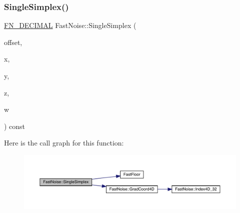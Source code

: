 \subsubsection{\texorpdfstring{Single\+Simplex()}{SingleSimplex()}\hspace{0.1cm}{\footnotesize\ttfamily [3/3]}}
{\footnotesize\ttfamily \mbox{\hyperlink{_fast_noise_8h_a75a9ef6d2541c4921815b885bfd449c3}{F\+N\+\_\+\+D\+E\+C\+I\+M\+AL}} Fast\+Noise\+::\+Single\+Simplex (\begin{DoxyParamCaption}\item[{unsigned char}]{offset,  }\item[{\mbox{\hyperlink{_fast_noise_8h_a75a9ef6d2541c4921815b885bfd449c3}{F\+N\+\_\+\+D\+E\+C\+I\+M\+AL}}}]{x,  }\item[{\mbox{\hyperlink{_fast_noise_8h_a75a9ef6d2541c4921815b885bfd449c3}{F\+N\+\_\+\+D\+E\+C\+I\+M\+AL}}}]{y,  }\item[{\mbox{\hyperlink{_fast_noise_8h_a75a9ef6d2541c4921815b885bfd449c3}{F\+N\+\_\+\+D\+E\+C\+I\+M\+AL}}}]{z,  }\item[{\mbox{\hyperlink{_fast_noise_8h_a75a9ef6d2541c4921815b885bfd449c3}{F\+N\+\_\+\+D\+E\+C\+I\+M\+AL}}}]{w }\end{DoxyParamCaption}) const\hspace{0.3cm}{\ttfamily [private]}}

Here is the call graph for this function\+:
\nopagebreak
\begin{figure}[H]
\begin{center}
\leavevmode
\includegraphics[width=350pt]{d1/dd8/class_fast_noise_a1f05efc093f8c7998014dfc3b77e0753_cgraph}
\end{center}
\end{figure}
\mbox{\label{class_fast_noise_aa23a186cee489865781430d344cad11d}} 
